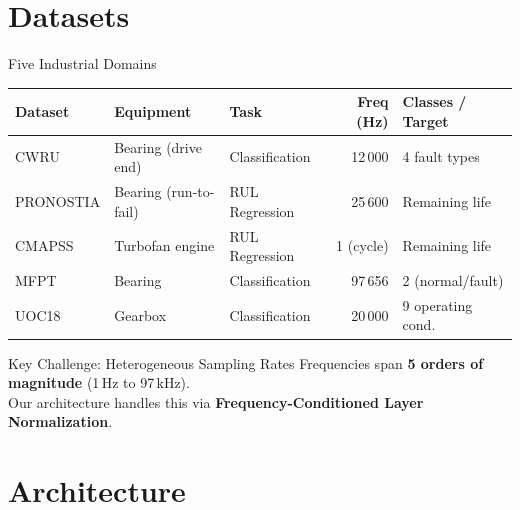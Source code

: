 \documentclass[aspectratio=169, 11pt]{beamer}
\begin{document}
\section{Datasets}

\begin{frame}{Five Industrial Domains}
\begin{table}
\centering
\small
\begin{tabular}{@{}lllrl@{}}
\toprule
\textbf{Dataset} & \textbf{Equipment} & \textbf{Task} & \textbf{Freq (Hz)} & \textbf{Classes / Target} \\
\midrule
CWRU      & Bearing (drive end)   & Classification & 12\,000   & 4 fault types \\
PRONOSTIA & Bearing (run-to-fail) & RUL Regression & 25\,600   & Remaining life \\
CMAPSS    & Turbofan engine       & RUL Regression & 1 (cycle) & Remaining life \\
MFPT      & Bearing               & Classification & 97\,656   & 2 (normal/fault) \\
UOC18     & Gearbox               & Classification & 20\,000   & 9 operating cond. \\
\bottomrule
\end{tabular}
\end{table}

\vspace{0.4cm}
\begin{block}{Key Challenge: Heterogeneous Sampling Rates}
Frequencies span \textbf{5 orders of magnitude} (1\,Hz to 97\,kHz).\\
Our architecture handles this via \textbf{Frequency-Conditioned Layer Normalization}.
\end{block}
\end{frame}

\section{Architecture}
\end{document}
